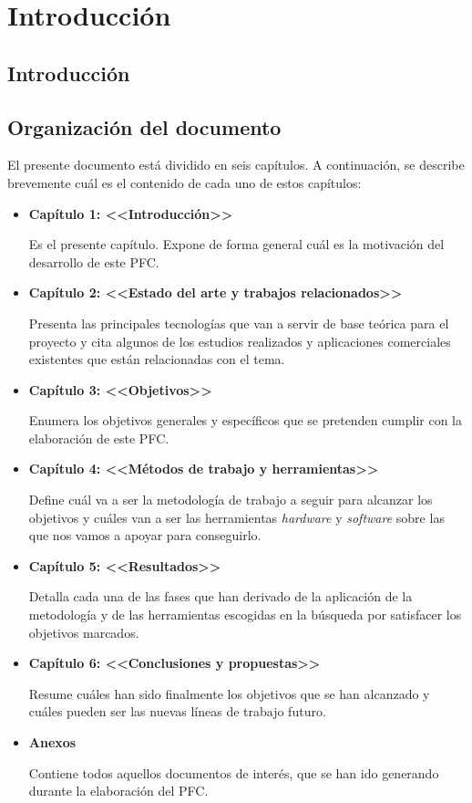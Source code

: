 
\chapter{Introducción}
\section{Introducción}

\section{Organización del documento}
El presente documento está dividido en seis capítulos. A continuación, se
describe brevemente cuál es el contenido de cada uno de estos capítulos:
\begin{itemize}
\item \textbf{Capítulo 1: <<Introducción>>}

Es el presente capítulo. Expone de forma general cuál es la motivación del
desarrollo de este \acs{PFC}.

\item \textbf{Capítulo 2: <<Estado del arte y trabajos relacionados>>}

Presenta las principales tecnologías que van a servir de base teórica para el 
proyecto y cita algunos de los estudios realizados y aplicaciones 
comerciales existentes que están relacionadas con el tema.

\item \textbf{Capítulo 3: <<Objetivos>>}

Enumera los objetivos generales y específicos que se pretenden cumplir con la  
elaboración de este \acs{PFC}.

\item \textbf{Capítulo 4: <<Métodos de trabajo y herramientas>>}

Define cuál va a ser la metodología de trabajo a seguir para
alcanzar los objetivos y cuáles van a ser las herramientas \emph{hardware} y
\emph{software} sobre las que nos vamos a apoyar para conseguirlo.

\item \textbf{Capítulo 5: <<Resultados>>}

Detalla cada una de las fases que han derivado de la aplicación de la
metodología y de las herramientas escogidas en la búsqueda por satisfacer
los objetivos marcados.

\item \textbf{Capítulo 6: <<Conclusiones y propuestas>>}

Resume cuáles han sido finalmente los objetivos que se han alcanzado y cuáles
pueden ser las nuevas líneas de trabajo futuro.

\item \textbf{Anexos}

Contiene todos aquellos documentos de interés, que se han ido generando durante 
la elaboración del \acs{PFC}.

\end{itemize}

